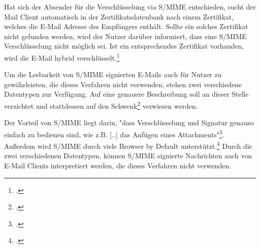\documentclass  [paper=a4,
				fontsize=12pt,
				listof=totoc,
				bibliography=totoc
				]{scrreprt}
\begin{document}
				Hat sich der Absender für die Verschlüsselung via \ac{S/MIME} entschieden, sucht der Mail Client automatisch in der Zertifikatsdatenbank nach einem Zertifikat, welches die E-Mail Adresse des Empfängers enthält. Sollte ein solches Zertifikat nicht gefunden werden, wird der Nutzer darüber informiert, dass eine \ac{S/MIME} Verschlüsselung nicht möglich sei. Ist ein entsprechendes Zertifikat vorhanden, wird die E-Mail hybrid verschlüsselt.\footcite[][S. 65]{Schwenk}
				
				
				Um die Lesbarkeit von \ac{S/MIME} signierten E-Mails auch für Nutzer zu gewährleisten, die dieses Verfahren nicht verwenden, stehen zwei verschiedene Datentypen zur Verfügung. Auf eine genauere Beschreibung soll an dieser Stelle verzichtet und stattdessen auf den Schwenk\footcite[Vgl.][S. 65]{Schwenk} verwiesen werden.
				\medskip
				


				
										
				Der Vorteil von \ac{S/MIME} liegt darin, "dass Verschlüsselung und Signatur genauso einfach zu bedienen sind, wie z.B. [..] das Anfügen eines Attachments"\footcite[Vgl.][S. 61]{Schwenk}. Außerdem wird \ac{S/MIME} durch viele Browser by Default unterstützt.\footcite[Vgl.][]{Duevel}
				Durch die zwei verschiedenen Datentypen, können \ac{S/MIME} signierte Nachrichten auch von E-Mail Clients interpretiert werden, die dieses Verfahren nicht verwenden. 
				\medskip
				
\end{document}
